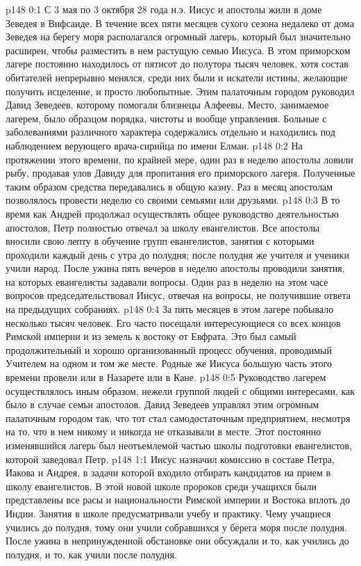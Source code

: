 \author{Комиссия срединников}
\vs p148 0:1 С 3 мая по 3 октября 28 года н.э. Иисус и апостолы жили в доме Зеведея в Вифсаиде. В течение всех пяти месяцев сухого сезона недалеко от дома Зеведея на берегу моря располагался огромный лагерь, который был значительно расширен, чтобы разместить в нем растущую семью Иисуса. В этом приморском лагере постоянно находилось от пятисот до полутора тысяч человек, хотя состав обитателей непрерывно менялся, среди них были и искатели истины, желающие получить исцеление, и просто любопытные. Этим палаточным городом руководил Давид Зеведеев, которому помогали близнецы Алфеевы. Место, занимаемое лагерем, было образцом порядка, чистоты и вообще управления. Больные с заболеваниями различного характера содержались отдельно и находились под наблюдением верующего врача\hyp{}сирийца по имени Елман.
\vs p148 0:2 На протяжении этого времени, по крайней мере, один раз в неделю апостолы ловили рыбу, продавая улов Давиду для пропитания его приморского лагеря. Полученные таким образом средства передавались в общую казну. Раз в месяц апостолам позволялось провести неделю со своими семьями или друзьями.
\vs p148 0:3 В то время как Андрей продолжал осуществлять общее руководство деятельностью апостолов, Петр полностью отвечал за школу евангелистов. Все апостолы вносили свою лепту в обучение групп евангелистов, занятия с которыми проходили каждый день с утра до полудня; после полудня же учителя и ученики учили народ. После ужина пять вечеров в неделю апостолы проводили занятия, на которых евангелисты задавали вопросы. Один раз в неделю на этом часе вопросов председательствовал Иисус, отвечая на вопросы, не получившие ответа на предыдущих собраниях.
\vs p148 0:4 За пять месяцев в этом лагере побывало несколько тысяч человек. Его часто посещали интересующиеся со всех концов Римской империи и из земель к востоку от Евфрата. Это был самый продолжительный и хорошо организованный процесс обучения, проводимый Учителем на одном и том же месте. Родные же Иисуса большую часть этого времени провели или в Назарете или в Кане.
\vs p148 0:5 Руководство лагерем осуществлялось иным образом, нежели группой людей с общими интересами, как было в случае семьи апостолов. Давид Зеведеев управлял этим огромным палаточным городом так, что тот стал самодостаточным предприятием, несмотря на то, что в нем никому и никогда не отказывали в месте. Этот постоянно изменявшийся лагерь был неотъемлемой частью школы подготовки евангелистов, которой заведовал Петр.
\vs p148 1:1 Иисус назначил комиссию в составе Петра, Иакова и Андрея, в задачи которой входило отбирать кандидатов на прием в школу евангелистов. В этой новой школе пророков среди учащихся были представлены все расы и национальности Римской империи и Востока вплоть до Индии. Занятия в школе предусматривали учебу и практику. Чему учащиеся учились до полудня, тому они учили собравшихся у берега моря после полудня. После ужина в непринужденной обстановке они обсуждали и то, как учились до полудня, и то, как учили после полудня.
